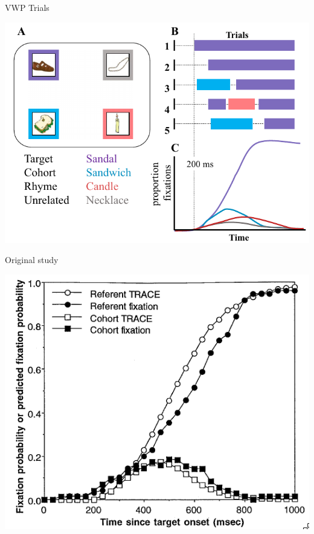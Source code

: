 \documentclass{beamer}
\begin{document}
\begin{frame}{VWP Trials}
\begin{center}
\includegraphics[scale=0.4]{img/bob_vwp_full.png}
\end{center}
\end{frame}

\begin{frame}{Original study}
\begin{center}
\includegraphics[scale=0.45]{img/allopenna_trace_compare.png}
\end{center}
\end{frame}
\end{document}
